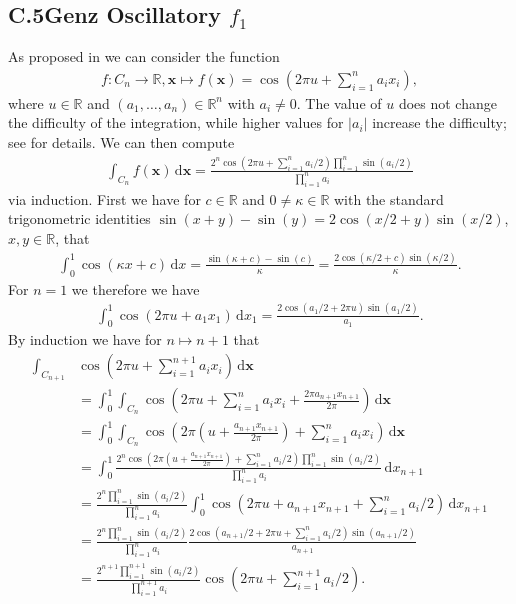 \documentclass[11pt]{article}
\def\R{\mathbb{R}}
\def\d{\,\mathrm{d}}
\newcommand{\abs}[1]{\left|#1\right|}
\def\bx{\mathbf{x}}
\begin{document}
\subsection*{C.5\hspace{0.5cm}Genz Oscillatory $f_1$}
As proposed in \cite[Table 1, p. 84]{Genz1984} we can consider the function
\begin{align*}
f\colon C_{n}\to\R, \bx \mapsto f(\bx) = \cos\left(2\pi u + \sum^{n}_{i=1} a_i x_i \right),
\end{align*}
where $u\in\mathbb{R}$ and $(a_1,\dots,a_n) \in \mathbb{R}^n$ with $a_i\neq 0$.
The value of $u$ does not change the difficulty of the integration, while higher values for $\abs{a_i}$ increase the difficulty; see \cite[p. 84]{Genz1984} for details. 
We can then compute
\begin{align*}
\int_{C_{n}} f(\bx) \d\bx = \frac{2^n \cos\left(2\pi u + \sum_{i=1}^{n}a_i/2\right) \prod_{i=1}^n \sin(a_i/2)}{\prod_{i=1}^n a_i}
\end{align*}
via induction. 
First we have for $c\in\mathbb{R}$ and $0\neq\kappa\in\mathbb{R}$ with the standard trigonometric identities $\sin(x+y)-\sin(y) = 2\cos(x/2+y)\sin(x/2)$, $x,y\in\mathbb{R}$, that 
\begin{align*}
\int_0^1 \cos(\kappa x  + c) \d x = \frac{\sin(\kappa + c) - \sin(c)}{\kappa} = \frac{2\cos(\kappa/2+c)\sin(\kappa/2)}{\kappa}.
\end{align*}
For $n=1$ we therefore we have
\begin{align*}
\int_0^1 \cos\left(2\pi u + a_1 x_1 \right) \d x_1 = \frac{2\cos(a_1/2+2\pi u)\sin(a_1/2)}{a_1}.
\end{align*}
By induction we have for $n \mapsto n+1$ that
\begin{align*}
\int_{C_{n+1}} &\cos\left(2\pi u + \sum^{n+1}_{i=1} a_i x_i \right) \d\bx \\
&= \int_0^1 \int_{C_{n}} \cos\left(2\pi u + \sum^{n}_{i=1} a_i x_i + \frac{2\pi a_{n+1}x_{n+1}}{2\pi}\right) \d\bx\\
&= \int_0^1 \int_{C_{n}} \cos\left(2\pi \left( u + \frac{a_{n+1}x_{n+1}}{2\pi} \right) + \sum^{n}_{i=1} a_i x_i \right) \d\bx\\
&= \int_0^1 \frac{2^n \cos\left(2\pi \left( u + \frac{a_{n+1}x_{n+1}}{2\pi} \right) + \sum_{i=1}^{n}a_i/2\right) \prod_{i=1}^n \sin(a_i/2)}{\prod_{i=1}^n a_i} \d x_{n+1}\\
&= \frac{2^n \prod_{i=1}^n \sin(a_i/2)}{\prod_{i=1}^n a_i} \int_0^1 \cos\left(2\pi u + a_{n+1}x_{n+1}  + \sum_{i=1}^{n}a_i/2\right) \d x_{n+1}\\
&= \frac{2^n \prod_{i=1}^n \sin(a_i/2)}{\prod_{i=1}^n a_i} \frac{2\cos\left(a_{n+1}/2+2\pi u + \sum_{i=1}^{n}a_i/2\right)\sin(a_{n+1}/2)}{a_{n+1}}\\
&= \frac{2^{n+1} \prod_{i=1}^{n+1} \sin(a_i/2)}{\prod_{i=1}^{n+1} a_i} \cos\left(2\pi u + \sum_{i=1}^{n+1}a_i/2\right).
\end{align*}
\end{document}
